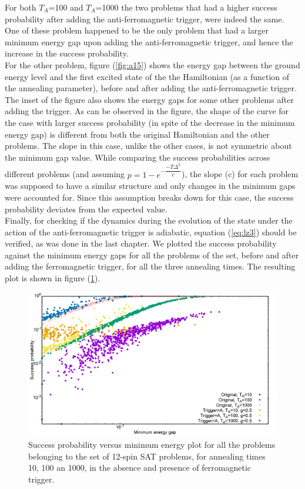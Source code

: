 \documentclass[../main.tex]{subfiles}
\begin{document}
For both $T_A$=100 and $T_A$=1000 the two problems that had a higher success probability after adding the anti-ferromagnetic trigger, were indeed the same. One of these problem happened to be the only problem that had a larger minimum energy gap upon adding the anti-ferromagnetic trigger, and hence the increase in the success probability. \\
For the other problem, figure (\ref{fig:a15}) shows the energy gap between the ground energy level and the first excited state of the the Hamiltonian (as a function of the annealing parameter), before and after adding the anti-ferromagnetic trigger. The inset of the figure also shows the energy gaps for some other problems after adding the trigger. As can be observed in the figure, the shape of the curve for the case with larger success probability (in spite of the decrease in the minimum energy gap) is different from both the original Hamiltonian and the other problems. The slope in this case, unlike the other cases, is not symmetric about the minimum gap value. While comparing the success probabilities across different problems (and assuming $p=1-e^{-\dfrac{-T {\Delta}^2}{c}}$), the slope (c) for  each problem was supposed to have a similar structure and only changes in the minimum gaps were accounted for. Since this assumption breaks down for this case, the success probability deviates from the expected value.\\

Finally, for checking if the dynamics during the evolution of the state under the action of the anti-ferromagnetic trigger is adiabatic, equation (\ref{eq:lz3}) should be verified, as was done in the last chapter. We plotted the success probability against the minimum energy gaps for all the problems of the set, before and after adding the ferromagnetic trigger, for all the three annealing times. The resulting plot is shown in figure (\ref{fig:a17}).

\begin{figure}[H]
\centering 
\includegraphics[scale=0.3]{SuccVsGap_OA_g0.png}
\caption{Success probability versus minimum energy plot for all the problems belonging to the set of 12-spin SAT problems, for annealing times 10, 100 an 1000, in the absence and presence of ferromagnetic trigger.}
\label{fig:a17}
\end{figure}
\end{document}
